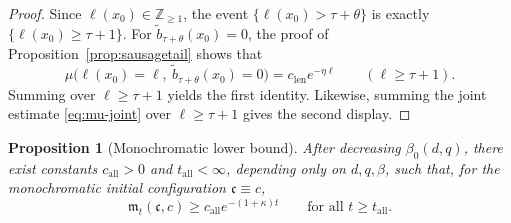\documentclass[letterpaper,11pt,reqno]{amsart}
\newtheorem{prop}[thm]{Proposition}
\theoremstyle{definition}
\begin{document}
\begin{proof}
Since \(\ell(x_0)\in\mathbb Z_{\ge1}\), the event \(\{\ell(x_0)>\tau+\theta\}\) is exactly
\(\{\ell(x_0)\ge\tau+1\}\). For \(\tilde b_{\tau+\theta}(x_0)=0\), the proof of
Proposition~\ref{prop:sausagetail} shows that
\[
\mu\bigl(\ell(x_0)=\ell,\ \tilde b_{\tau+\theta}(x_0)=0\bigr)=c_{\mathrm{len}}e^{-\eta\ell}
\qquad(\ell\ge \tau+1).
\]
Summing over \(\ell\ge\tau+1\) yields the first identity. Likewise, summing the joint estimate
\eqref{eq:mu-joint} over \(\ell\ge\tau+1\) gives the second display.
\end{proof}


\begin{prop}[Monochromatic lower bound]\label{prop:all-one-magnetization-bound}
After decreasing \(\beta_0(d,q)\), there exist constants
\(c_{\mathrm{all}}>0\)  and \(t_{\mathrm{all}}<\infty\),
depending only on \(d,q,\beta\), such that, for the monochromatic initial configuration \(\mathfrak c\equiv c\),
\[
    \mathfrak m_t(\mathfrak c,c)
    \ge
    c_{\mathrm{all}}e^{-(1+\kappa)t}
    \qquad\text{for all }t\ge t_{\mathrm{all}}.
\]
\end{prop}
\end{document}
